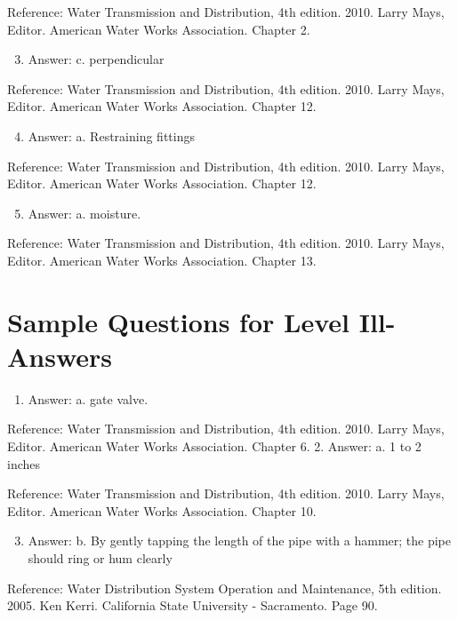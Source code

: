 \documentclass[10pt]{article}
\begin{document}
Reference: Water Transmission and Distribution, 4th edition. 2010. Larry Mays, Editor. American Water Works Association. Chapter 2.

\begin{enumerate}
  \setcounter{enumi}{2}
  \item Answer: c. perpendicular
\end{enumerate}

Reference: Water Transmission and Distribution, 4th edition. 2010. Larry Mays, Editor. American Water Works Association. Chapter 12.

\begin{enumerate}
  \setcounter{enumi}{3}
  \item Answer: a. Restraining fittings
\end{enumerate}

Reference: Water Transmission and Distribution, 4th edition. 2010. Larry Mays, Editor. American Water Works Association. Chapter 12.

\begin{enumerate}
  \setcounter{enumi}{4}
  \item Answer: a. moisture.
\end{enumerate}

Reference: Water Transmission and Distribution, 4th edition. 2010. Larry Mays, Editor. American Water Works Association. Chapter 13.

\section{Sample Questions for Level Ill-Answers}
\begin{enumerate}
  \item Answer: a. gate valve.
\end{enumerate}

Reference: Water Transmission and Distribution, 4th edition. 2010. Larry Mays, Editor. American Water Works Association. Chapter 6. 2. Answer: a. 1 to 2 inches

Reference: Water Transmission and Distribution, 4th edition. 2010. Larry Mays, Editor. American Water Works Association. Chapter 10.

\begin{enumerate}
  \setcounter{enumi}{2}
  \item Answer: b. By gently tapping the length of the pipe with a hammer; the pipe should ring or hum clearly
\end{enumerate}

Reference: Water Distribution System Operation and Maintenance, 5th edition. 2005. Ken Kerri. California State University - Sacramento. Page 90.
\end{document}
